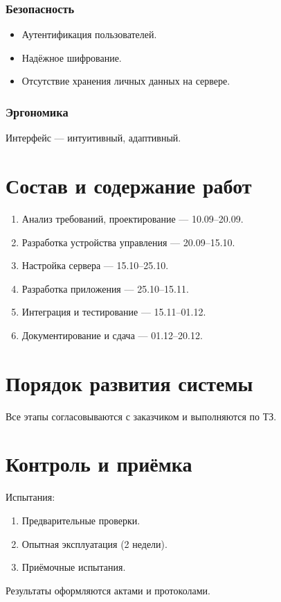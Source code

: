 \documentclass[oneside,a4paper,14pt]{extarticle}
\begin{document}
\subsubsection{Безопасность}
\begin{itemize}
    \item Аутентификация пользователей.
    \item Надёжное шифрование.
    \item Отсутствие хранения личных данных на сервере.
\end{itemize}

\subsubsection{Эргономика}
Интерфейс — интуитивный, адаптивный.

\section{Состав и содержание работ}
\begin{enumerate}
    \item Анализ требований, проектирование — 10.09–20.09.
    \item Разработка устройства управления — 20.09–15.10.
    \item Настройка сервера — 15.10–25.10.
    \item Разработка приложения — 25.10–15.11.
    \item Интеграция и тестирование — 15.11–01.12.
    \item Документирование и сдача — 01.12–20.12.
\end{enumerate}

\section{Порядок развития системы}
Все этапы согласовываются с заказчиком и выполняются по ТЗ.

\section{Контроль и приёмка}
Испытания:
\begin{enumerate}
    \item Предварительные проверки.
    \item Опытная эксплуатация (2 недели).
    \item Приёмочные испытания.
\end{enumerate}
Результаты оформляются актами и протоколами.
\end{document}
